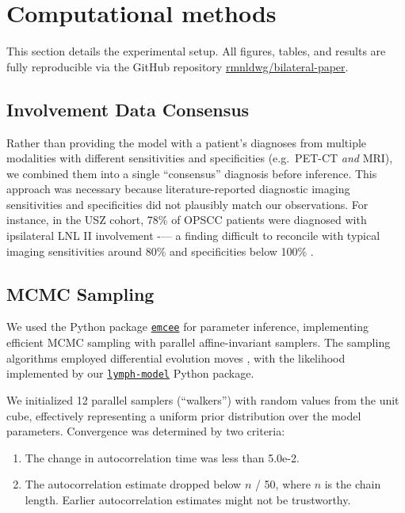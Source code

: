 \documentclass[
  sn-mathphys-num,
]{sn-jnl}
\providecommand{\tightlist}{%
  \setlength{\itemsep}{0pt}\setlength{\parskip}{0pt}}\usepackage{longtable,booktabs,array}
\begin{document}
\section{Computational methods}\label{sec-methods}

This section details the experimental setup. All figures, tables, and
results are fully reproducible via the GitHub repository
\href{https://github.com/rmnldwg/bilateral-paper}{rmnldwg/bilateral-paper}.

\subsection{Involvement Data Consensus}\label{sec-methods-consensus}

Rather than providing the model with a patient's diagnoses from multiple
modalities with different sensitivities and specificities (e.g.~PET-CT
\emph{and} MRI), we combined them into a single ``consensus'' diagnosis
before inference. This approach was necessary because
literature-reported diagnostic imaging sensitivities and specificities
did not plausibly match our observations. For instance, in the USZ
cohort, 78\% of OPSCC patients were diagnosed with ipsilateral LNL II
involvement -\/--- a finding difficult to reconcile with typical imaging
sensitivities around 80\% and specificities below 100\%
\citep{debondt_detection_2007, kyzas_18ffluorodeoxyglucose_2008}.

\subsection{MCMC Sampling}\label{sec-sampling}

We used the Python package
\href{https://emcee.readthedocs.io/en/stable/}{\texttt{emcee}}
\citep{foreman-mackey_emcee_2013} for parameter inference, implementing
efficient MCMC sampling with parallel affine-invariant samplers. The
sampling algorithms employed differential evolution moves
\citep{terbraak_differential_2008, nelson_run_2013}, with the likelihood
implemented by our
\href{https://lymph-model.readthedocs.io/en/stable/}{\texttt{lymph-model}}
Python package.

We initialized 12 parallel samplers (``walkers'') with random values
from the unit cube, effectively representing a uniform prior
distribution over the model parameters. Convergence was determined by
two criteria:

\begin{enumerate}
\def\labelenumi{\arabic{enumi}.}
\tightlist
\item
  The change in autocorrelation time was less than 5.0e-2.
\item
  The autocorrelation estimate dropped below \(n\) / 50, where \(n\) is
  the chain length. Earlier autocorrelation estimates might not be
  trustworthy.
\end{enumerate}
\end{document}
